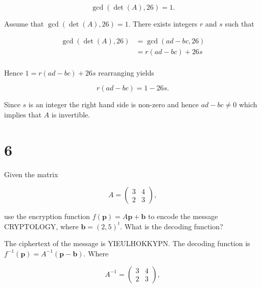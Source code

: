 \documentclass[a4paper]{article}
\begin{document}
$$\gcd(\det(A), 26) = 1.$$

Assume that $\gcd(\det(A), 26) = 1$. There exists integers $r$ and $s$ such that

\begin{align*}
\gcd(\det(A), 26) &= \gcd(ad - bc, 26) \\
&= r(ad-bc) + 26s \\
\end{align*}

Hence $1 = r(ad-bc) + 26s$ rearranging yields

$$r(ad - bc) = 1 - 26s.$$

Since $s$ is an integer the right hand side is non-zero and hence $ad - bc \neq 0$ which implies that $A$ is invertible.


\section*{6}

Given the matrix

$$A = \begin{pmatrix}
3 & 4 \\
2 & 3
\end{pmatrix},$$

use the encryption function $f(\mathbf{p}) = A \mathbf{p} + \mathbf{b}$ to encode the message CRYPTOLOGY, where $\mathbf{b} = (2,5)^t$. What is the decoding function?

\vspace{\baselineskip}

The ciphertext of the message is YIEULHOKKYPN. The decoding function is $f^{-1}(\mathbf{p}) = A^{-1} (\mathbf{p} - \mathbf{b})$. Where 

$$A^{-1} = \begin{pmatrix}
3 & 4 \\
2 & 3
\end{pmatrix},$$
\end{document}
